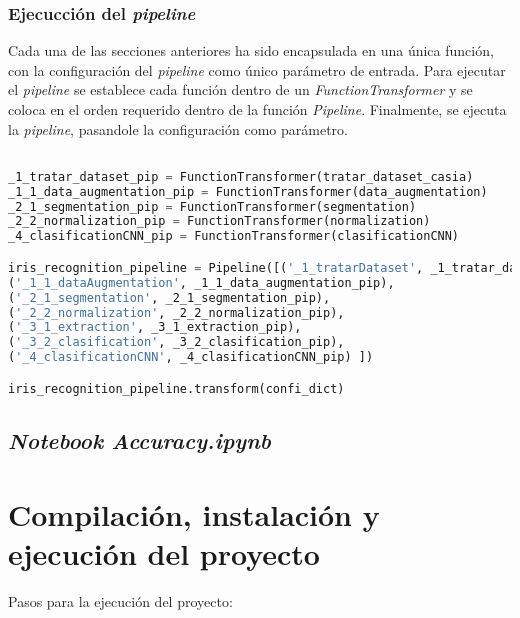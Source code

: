 {\subsubsection{Ejecucción del \textit{pipeline}}

Cada una de las secciones anteriores ha sido encapsulada en una única función, con la configuración del \textit{pipeline} como único parámetro de entrada.
Para ejecutar el \textit{pipeline} se establece cada función dentro de un \textit{FunctionTransformer} y se coloca en el orden requerido dentro de la función \textit{Pipeline}.
Finalmente, se ejecuta la \textit{pipeline}, pasandole la configuración como parámetro.


\begin{lstlisting}[language=Python] 

_1_tratar_dataset_pip = FunctionTransformer(tratar_dataset_casia)
_1_1_data_augmentation_pip = FunctionTransformer(data_augmentation)
_2_1_segmentation_pip = FunctionTransformer(segmentation)
_2_2_normalization_pip = FunctionTransformer(normalization)
_4_clasificationCNN_pip = FunctionTransformer(clasificationCNN)

iris_recognition_pipeline = Pipeline([('_1_tratarDataset', _1_tratar_dataset_pip), 
('_1_1_dataAugmentation', _1_1_data_augmentation_pip), 
('_2_1_segmentation', _2_1_segmentation_pip), 
('_2_2_normalization', _2_2_normalization_pip),
('_3_1_extraction', _3_1_extraction_pip),
('_3_2_clasification', _3_2_clasification_pip), 
('_4_clasificationCNN', _4_clasificationCNN_pip) ])

iris_recognition_pipeline.transform(confi_dict)

\end{lstlisting} 

\subsection{\textit{Notebook} \textit{Accuracy.ipynb}} \label{anx:accuracy}

\section{Compilación, instalación y ejecución del proyecto}

Pasos para la ejecución del proyecto:

}
